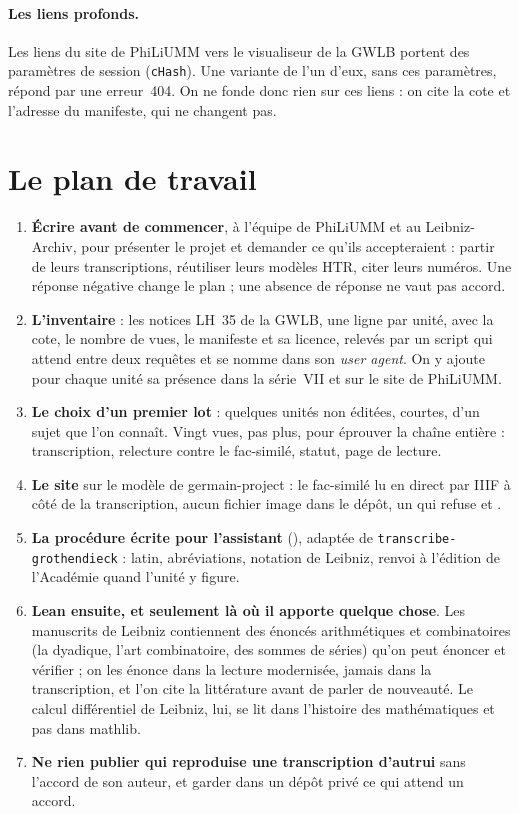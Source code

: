 \paragraph{Les liens profonds.} Les liens du site de PhiLiUMM vers le visualiseur de la
GWLB portent des paramètres de session (\texttt{cHash}). Une variante de l'un d'eux, sans
ces paramètres, répond par une erreur~404. On ne fonde donc rien sur ces liens : on cite la
cote et l'adresse du manifeste, qui ne changent pas.

\section{Le plan de travail}

\begin{enumerate}
  \item \textbf{Écrire avant de commencer}, à l'équipe de PhiLiUMM et au Leibniz-Archiv,
        pour présenter le projet et demander ce qu'ils accepteraient : partir de leurs
        transcriptions, réutiliser leurs modèles HTR, citer leurs numéros. Une réponse
        négative change le plan ; une absence de réponse ne vaut pas accord.
  \item \textbf{L'inventaire} : les notices LH~35 de la GWLB, une ligne par unité, avec la
        cote, le nombre de vues, le manifeste et sa licence, relevés par un script qui
        attend entre deux requêtes et se nomme dans son \emph{user agent}. On y ajoute pour
        chaque unité sa présence dans la série~VII et sur le site de PhiLiUMM.
  \item \textbf{Le choix d'un premier lot} : quelques unités non éditées, courtes, d'un
        sujet que l'on connaît. Vingt vues, pas plus, pour éprouver la chaîne
        entière : transcription, relecture contre le fac-similé, statut, page de lecture.
  \item \textbf{Le site} sur le modèle de germain-project : le fac-similé lu en direct par
        IIIF à côté de la transcription, aucun fichier image dans le dépôt, un
         qui refuse  et .
  \item \textbf{La procédure écrite pour l'assistant} (), adaptée de
        \texttt{transcribe-grothendieck} : latin, abréviations, notation de Leibniz,
        renvoi à l'édition de l'Académie quand l'unité y figure.
  \item \textbf{Lean ensuite, et seulement là où il apporte quelque chose}. Les manuscrits de
        Leibniz contiennent des énoncés arithmétiques et combinatoires (la dyadique, l'art
        combinatoire, des sommes de séries) qu'on peut énoncer et vérifier ; on les énonce
        dans la lecture modernisée, jamais dans la transcription, et l'on cite la
        littérature avant de parler de nouveauté. Le calcul différentiel de Leibniz, lui,
        se lit dans l'histoire des mathématiques et pas dans mathlib.
  \item \textbf{Ne rien publier qui reproduise une transcription d'autrui} sans l'accord de
        son auteur, et garder dans un dépôt privé ce qui attend un accord.
\end{enumerate}

